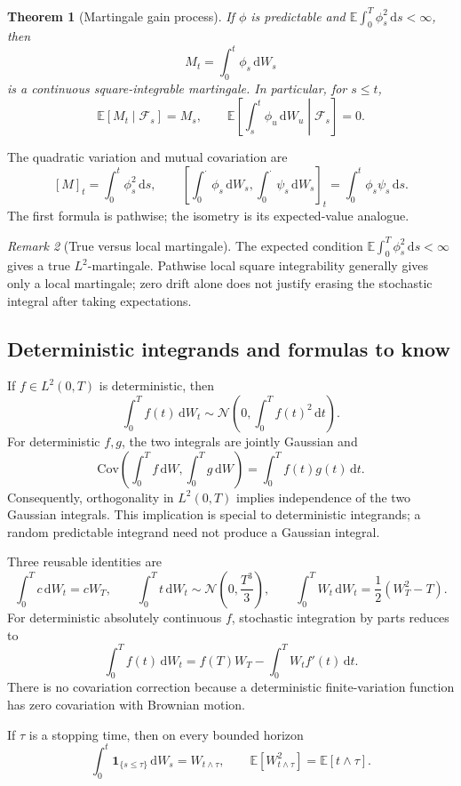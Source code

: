 \documentclass[11pt]{article}
\newcommand{\F}{\mathcal{F}}
\newcommand{\E}{\mathbb{E}}
\newcommand{\Cov}{\mathrm{Cov}}
\newcommand{\dd}{\,\mathrm{d}}
\newcommand{\1}{\mathbf{1}}
\theoremstyle{plain}
\newtheorem{theorem}{Theorem}[section]
\theoremstyle{definition}
\theoremstyle{remark}
\newtheorem{remark}[theorem]{Remark}
\begin{document}
\begin{theorem}[Martingale gain process]
If \(\phi\) is predictable and
\(\E\int_0^T\phi_s^2\dd s<\infty\), then
\[
M_t=\int_0^t\phi_s\dd W_s
\]
is a continuous square-integrable martingale. In particular, for \(s\leq t\),
\[
\boxed{
\E[M_t\mid\F_s]=M_s,
\qquad
\E\left[\int_s^t\phi_u\dd W_u\middle|\F_s\right]=0.}
\]
\end{theorem}

The quadratic variation and mutual covariation are
\[
\boxed{
[M]_t=\int_0^t\phi_s^2\dd s,
\qquad
\left[\int_0^\cdot\phi_s\dd W_s,
       \int_0^\cdot\psi_s\dd W_s\right]_t
=\int_0^t\phi_s\psi_s\dd s.}
\]
The first formula is pathwise; the isometry is its expected-value analogue.

\begin{remark}[True versus local martingale]
The expected condition
\(\E\int_0^T\phi_s^2\dd s<\infty\) gives a true \(L^2\)-martingale.
Pathwise local square integrability generally gives only a local martingale;
zero drift alone does not justify erasing the stochastic integral after
taking expectations.
\end{remark}

\subsection{Deterministic integrands and formulas to know}

If \(f\in L^2(0,T)\) is deterministic, then
\[
\boxed{
\int_0^Tf(t)\dd W_t
\sim\mathcal N\left(0,\int_0^Tf(t)^2\dd t\right).}
\]
For deterministic \(f,g\), the two integrals are jointly Gaussian and
\[
\Cov\left(\int_0^Tf\dd W,\int_0^Tg\dd W\right)
=\int_0^Tf(t)g(t)\dd t.
\]
Consequently, orthogonality in \(L^2(0,T)\) implies independence of the two
Gaussian integrals. This implication is special to deterministic integrands;
a random predictable integrand need not produce a Gaussian integral.

Three reusable identities are
\[
\boxed{
\int_0^Tc\dd W_t=cW_T,
\qquad
\int_0^Tt\dd W_t\sim\mathcal N\left(0,\frac{T^3}{3}\right),
\qquad
\int_0^TW_t\dd W_t=\frac12(W_T^2-T).}
\]
For deterministic absolutely continuous \(f\), stochastic integration by
parts reduces to
\[
\boxed{
\int_0^Tf(t)\dd W_t
=f(T)W_T-\int_0^TW_tf'(t)\dd t.}
\]
There is no covariation correction because a deterministic finite-variation
function has zero covariation with Brownian motion.

If \(\tau\) is a stopping time, then on every bounded horizon
\[
\boxed{
\int_0^t\1_{\{s\leq\tau\}}\dd W_s=W_{t\wedge\tau},
\qquad
\E[W_{t\wedge\tau}^2]=\E[t\wedge\tau].}
\]
\end{document}
